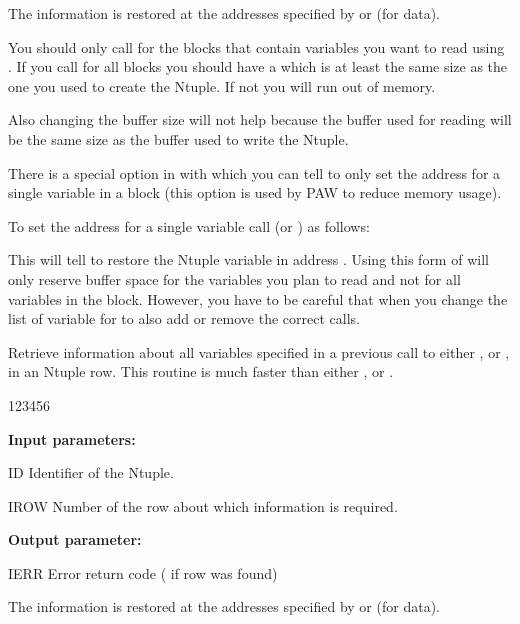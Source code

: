 The information is restored at the addresses specified by 
or  (for  data).

You should only call  for the blocks that
contain variables you want to read using .
If you call  for all blocks you should
have a  which is at least the same size as the one you used to
create the Ntuple.
If not you will run out of memory.

Also changing the buffer size will not help because the buffer used for
reading will be the same size as the buffer used to write the Ntuple.

There is a special option in  with which you can tell
 to only set the address
for a single variable in a block (this option
is used by PAW to reduce memory usage).

To set the address for a single variable call
 (or ) as follows:
This will tell  to restore the Ntuple
variable  in address .
Using this form of  will only reserve buffer space for
the variables you plan to read and not for all variables in the block.
However, you have to be careful that when you change the list
of variable for
 to also add or remove the correct  calls.


\Action

Retrieve information about all variables specified in a previous
call to either ,  or , in an Ntuple row.
This routine is much faster than either ,  or
.

\begin{DLttc}{123456}
\item[{\rm\bf Input parameters:}]
\item[ID] Identifier of the Ntuple.
\item[IROW] Number of the row about which information is required.
\item[{\rm\bf Output parameter:}]
\item[IERR] Error return code ( if row was found)
\end{DLttc}

The information is restored at the addresses specified by 
or  (for  data).

